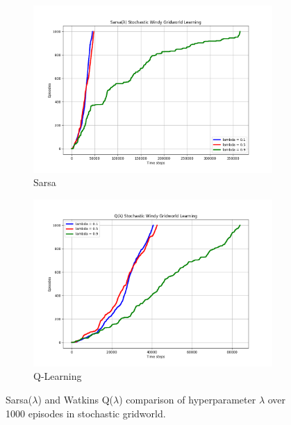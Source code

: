 \documentclass{article}
\begin{document}
\begin{figure}[h!]
  \centering
  \begin{subfigure}{0.45\textwidth} 
    \includegraphics[width=\textwidth]{sarsa_stochastic_lambda_choice.png}
    \caption{Sarsa}
  \end{subfigure}
  \hspace{0.05\textwidth}  
  \begin{subfigure}{0.45\textwidth}  
    \includegraphics[width=\textwidth]{q_stochastic_lambda_choice.png}
    \caption{Q-Learning}
  \end{subfigure}
  \caption{Sarsa($\lambda$) and Watkins Q($\lambda$) comparison of hyperparameter $\lambda$ over 1000 episodes in stochastic gridworld.}
  \label{fig:lambda_stochastic_comparison}
\end{figure}
\end{document}
